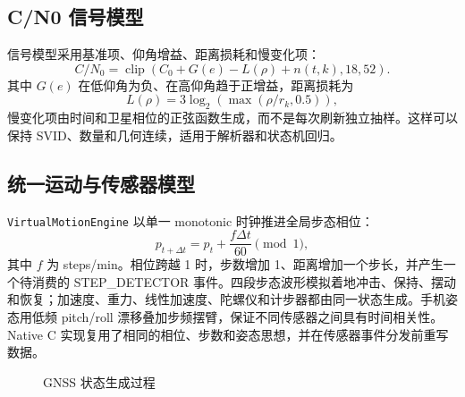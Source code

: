 \subsection{C/N0 信号模型}
信号模型采用基准项、仰角增益、距离损耗和慢变化项：
\[
 C/N_0=\operatorname{clip}\left(C_0+G(e)-L(\rho)+n(t,k),18,52\right).
\]
其中 $G(e)$ 在低仰角为负、在高仰角趋于正增益，距离损耗为
\[
 L(\rho)=3\log_2\left(\max\left(\rho/r_k,0.5\right)\right),
\]
慢变化项由时间和卫星相位的正弦函数生成，而不是每次刷新独立抽样。这样可以保持 SVID、数量和几何连续，适用于解析器和状态机回归。

\subsection{统一运动与传感器模型}
\texttt{VirtualMotionEngine} 以单一 monotonic 时钟推进全局步态相位：
\[
 p_{t+\Delta t}=p_t+\frac{f\Delta t}{60}\pmod 1,
\]
其中 $f$ 为 steps/min。相位跨越 1 时，步数增加 1、距离增加一个步长，并产生一个待消费的 STEP\_DETECTOR 事件。四段步态波形模拟着地冲击、保持、摆动和恢复；加速度、重力、线性加速度、陀螺仪和计步器都由同一状态生成。手机姿态用低频 pitch/roll 漂移叠加步频摆臂，保证不同传感器之间具有时间相关性。Native C 实现复用了相同的相位、步数和姿态思想，并在传感器事件分发前重写数据。

\begin{figure}[htbp]
\centering
{}
\caption{GNSS 状态生成过程}
\label{fig:gnss}
\end{figure}